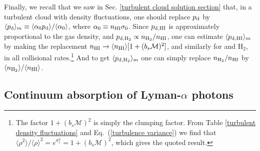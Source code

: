 \documentclass[fleqn,usenatbib]{mnras}
\newcommand\HeI{\ion{He}{I}\xspace} %
\begin{document}
Finally, we recall that we saw in Sec. \ref{turbulent cloud solution section} that, in a turbulent cloud with density fluctuations, one should replace $p_{\rm d}$ by $\langle p_{\rm d} \rangle_{m} \equiv \langle \alpha_0 p_{\rm d} \rangle/\langle \alpha_0 \rangle$, where $\alpha_0 \equiv n_{\rm HI} \sigma_0$. Since $p_{\rm d, HI}$ is approximately proportional to the gas density, and $p_{\rm d,H_2} \propto n_{\rm H_2}/n_{\rm HI}$, one can estimate $\langle p_{\rm d,HI} \rangle_{m}$ by making the replacement $n_{\rm HI} \rightarrow \langle n_{\rm HI} \rangle [1 + (b_s \mathcal{M})^2]$, and similarly for \HeI and H$_2$, in all collisional rates.\footnote{The factor $1 + (b_s \mathcal{M})^2$ is simply the clumping factor. From Table \ref{turbulent density fluctuations} and Eq.~(\ref{turbulence variance}) we find that $\langle \rho^2 \rangle/\langle \rho \rangle^2 = e^{\sigma_s^2} = 1 + (b_s \mathcal{M})^2$, which gives the quoted result. } And to get $\langle p_{\rm d,H_2} \rangle_{m}$ one can simply replace $n_{\rm H_2}/n_{\rm HI}$ by $\langle n_{\rm H_2}\rangle/\langle n_{\rm HI}\rangle$. 


\subsection{Continuum absorption of Lyman-\texorpdfstring{\boldmath$\alpha$}{alpha} photons}
\label{Lya absorption processes}
\end{document}
